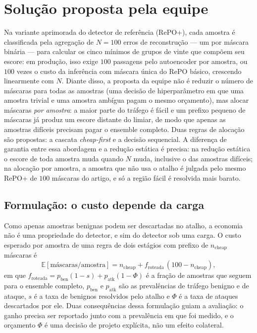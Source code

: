 \documentclass[conference]{IEEEtran}
\begin{document}
\section{Solução proposta pela equipe}\label{sec:proposta}

Na variante aprimorada do detector de referência (RePO+), cada amostra é classificada pela agregação de $N = 100$ erros de reconstrução — um por máscara binária — para calcular os cinco mínimos de grupos de vinte que compõem seu escore: em produção, isso exige $100$ passagens pelo autoencoder por amostra, ou $100$ vezes o custo da inferência com máscara única do RePO básico, crescendo linearmente com $N$.
Diante disso, a proposta da equipe não é reduzir o número de máscaras para todas as amostras (uma decisão de hiperparâmetro em que uma amostra trivial e uma amostra ambígua pagam o mesmo orçamento), mas alocar máscaras \emph{por amostra}: a maior parte do tráfego é fácil e um prefixo pequeno de máscaras já produz um escore distante do limiar, de modo que apenas as amostras difíceis precisam pagar o ensemble completo.
Duas regras de alocação são propostas: a cascata \textit{cheap-first} e a decisão sequencial.
A diferença de garantia entre essa abordagem e a redução estática é precisa: na redução estática o escore de toda amostra muda quando $N$ muda, inclusive o das amostras difíceis; na alocação por amostra, a amostra que não usa o atalho é julgada pelo mesmo RePO+ de $100$ máscaras do artigo, e só a região fácil é resolvida mais barato.

\subsection{Formulação: o custo depende da carga}

Como apenas amostras benignas podem ser descartadas no atalho, a economia não é uma propriedade do detector, e sim do detector sob uma carga.
O custo esperado por amostra de uma regra de dois estágios com prefixo de $n_{\text{cheap}}$ máscaras é
\begin{equation}
\mathbb{E}[\text{máscaras/amostra}] = n_{\text{cheap}} + f_{\text{roteada}}\,\left(100 - n_{\text{cheap}}\right),
\label{eq:custo_cascata}
\end{equation}
em que $f_{\text{roteada}} = p_{\text{ben}}\left(1 - s\right) + p_{\text{atk}}\left(1 - \Phi\right)$ é a fração de amostras que seguem para o ensemble completo, $p_{\text{ben}}$ e $p_{\text{atk}}$ são as prevalências de tráfego benigno e de ataque, $s$ é a taxa de benignos resolvidos pelo atalho e $\Phi$ é a taxa de ataques descartados por ele.
Duas consequências dessa formulação guiam a avaliação: o ganho precisa ser reportado junto com a prevalência em que foi medido, e o orçamento $\Phi$ é uma decisão de projeto explícita, não um efeito colateral.
\end{document}
